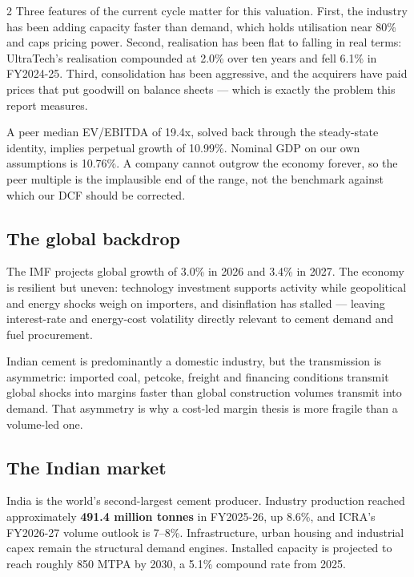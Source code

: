\begin{paracol}{2}
Three features of the current cycle matter for this valuation. First, the industry has
been adding capacity faster than demand, which holds utilisation near 80\% and caps
pricing power. Second, realisation has been flat to falling in real terms:
UltraTech's realisation compounded at 2.0\% over ten years and fell 6.1\% in
FY2024-25. Third, consolidation has been aggressive, and the acquirers have paid
prices that put goodwill on balance sheets — which is exactly the problem this report
measures.

\begin{keybox}
A peer median EV/EBITDA of 19.4x, solved back through the steady-state identity,
implies perpetual growth of 10.99\%. Nominal GDP on our own assumptions is 10.76\%.
A company cannot outgrow the economy forever, so the peer multiple is the
implausible end of the range, not the benchmark against which our DCF should be
corrected.
\end{keybox}

\subsection{The global backdrop}

The IMF projects global growth of 3.0\% in 2026 and 3.4\% in 2027. The economy is
resilient but uneven: technology investment supports activity while geopolitical and
energy shocks weigh on importers, and disinflation has stalled — leaving interest-rate
and energy-cost volatility directly relevant to cement demand and fuel procurement.

Indian cement is predominantly a domestic industry, but the transmission is
asymmetric: imported coal, petcoke, freight and financing conditions transmit global
shocks into margins faster than global construction volumes transmit into demand. That
asymmetry is why a cost-led margin thesis is more fragile than a volume-led one.

\subsection{The Indian market}

India is the world's second-largest cement producer. Industry production reached
approximately \textbf{491.4 million tonnes} in FY2025-26, up 8.6\%, and ICRA's
FY2026-27 volume outlook is 7--8\%. Infrastructure, urban housing and industrial capex
remain the structural demand engines. Installed capacity is projected to reach roughly
850 MTPA by 2030, a 5.1\% compound rate from 2025.


\end{paracol}
